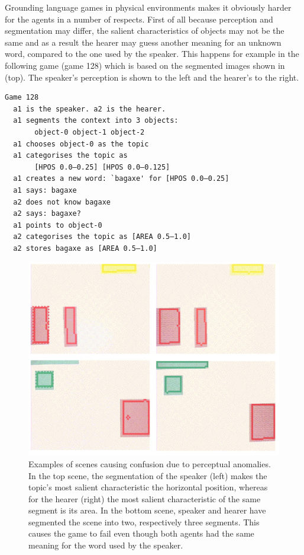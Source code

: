 Grounding language games in physical environments
makes it obviously harder
for the agents in a number of respects. First of 
all because perception and segmentation may differ, 
the salient characteristics of objects may not be the same
and as a result the hearer may guess another meaning for an 
unknown word, compared to 
the one used by the speaker. This happens for
example in the following game (game 128) which is based on 
the segmented images shown in  (top). The
speaker's perception is shown to the left and the 
hearer's to the right. 
\begin{verbatim}
Game 128
  a1 is the speaker. a2 is the hearer. 
  a1 segments the context into 3 objects: 
       object-0 object-1 object-2
  a1 chooses object-0 as the topic 
  a1 categorises the topic as 
       [HPOS 0.0–0.25] [HPOS 0.0–0.125]
  a1 creates a new word: `bagaxe' for [HPOS 0.0–0.25]
  a1 says: bagaxe
  a2 does not know bagaxe
  a2 says: bagaxe?
  a1 points to object-0
  a2 categorises the topic as [AREA 0.5–1.0]
  a2 stores bagaxe as [AREA 0.5–1.0]
\end{verbatim}


\begin{figure}
\begin{center}
\includegraphics[width=0.8\columnwidth]{chap7/figs/plate-16.pdf}
\end{center}
\caption{Examples of scenes causing confusion
due to perceptual anomalies. In the top scene, 
the segmentation of the speaker (left) makes the 
topic's most salient characteristic the horizontal
position, whereas for the hearer (right) the most salient
characteristic of the same segment is its area. In the 
bottom scene, speaker and hearer have segmented the 
scene into two, respectively three segments. This 
causes the game to fail even though both agents 
had the same meaning for the word used by the speaker.}
\label{fig:plate-16}
\end{figure}

